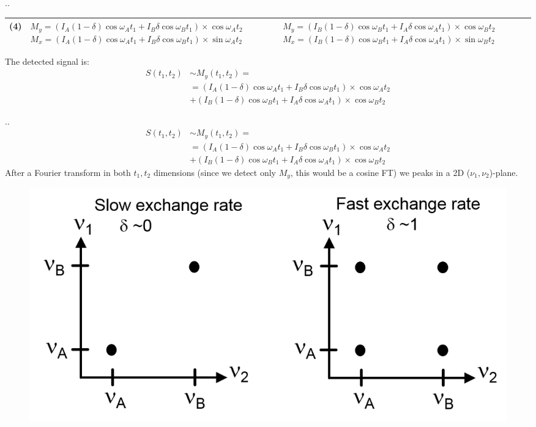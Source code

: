 \documentclass[handout]{beamer}
\begin{document}
\begin{frame}{\thesection.\thesubsection. \insertsubsection}
{\begin{table}[ht]
\begin{tabular}{  C{0.2cm}  L{5.0cm}  L{5.5cm} }
            (4) &  $M_y = (I_A (1- \delta) \cos \omega_A t_1 + I_B \delta \cos \omega_B t_1) \times \cos \omega_A t_2$  \newline 
             $M_x = (I_A (1- \delta) \cos \omega_A t_1 + I_B \delta \cos \omega_B t_1) \times \sin \omega_A t_2$            
            &
            $M_y = (I_B (1- \delta) \cos \omega_B t_1 + I_A \delta \cos \omega_A t_1) \times \cos \omega_B t_2$  \newline 
            $M_x = (I_B (1- \delta) \cos \omega_B t_1 + I_A \delta \cos \omega_A t_1) \times \sin \omega_B t_2$            
            \\ \hline         
			\hline
		\end{tabular}	     	     
		\label{tab: 2D exchange}		
	\end{table}
  }   

\normalsize{
The detected signal is:
\begin{align*}
  S(t_1,t_2) &\sim M_y(t_1,t_2)  = \\
   &=(I_A (1- \delta) \cos \omega_A t_1 + I_B \delta \cos \omega_B t_1) \times \cos \omega_A t_2 \\
   &+ (I_B (1- \delta) \cos \omega_B t_1 + I_A \delta \cos \omega_A t_1) \times \cos \omega_B t_2  
\end{align*}
}
\end{frame}

\begin{frame}{\thesection.\thesubsection. \insertsubsection}
	\begin{align*}
	S(t_1,t_2) &\sim M_y(t_1,t_2)  = \\
	&=(I_A (1- \delta) \cos \omega_A t_1 + I_B \delta \cos \omega_B t_1) \times \cos \omega_A t_2 \\
	&+ (I_B (1- \delta) \cos \omega_B t_1 + I_A \delta \cos \omega_A t_1) \times \cos \omega_B t_2  
	\end{align*}
  After a Fourier transform in both $t_1,t_2$ dimensions (since we detect only $M_y$, this would be a cosine FT) we peaks in a 2D ($\nu_1,\nu_2$)-plane.  
  \begin{figure}
  	\centering
  	\includegraphics[scale=0.5]{figures/2D_exchange.png}
  \end{figure}  
\end{frame}
\end{document}
